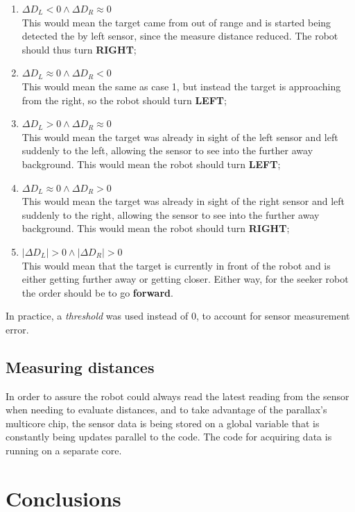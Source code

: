 \documentclass[sigconf,nonacm]{acmart}
\begin{document}
\begin{enumerate}
     \item $\Delta D_L<0 \wedge \Delta D_R \approx 0$ \\ This would mean the
     target came from out of range and is started being detected the by left
     sensor, since the measure distance reduced. The robot should thus
     turn \textbf{RIGHT};
     
     \item $\Delta D_L\approx 0\wedge \Delta D_R < 0$ \\ This would mean the same
     as case 1, but instead the target is approaching from the right, so the
     robot should turn \textbf{LEFT};

     \item $\Delta D_L>0\wedge \Delta D_R \approx 0$ \\ This would mean the
     target was already in sight of the left sensor and left suddenly to the
     left, allowing the sensor to see into the further away background. This
     would mean the robot should turn \textbf{LEFT};
     
     \item $\Delta D_L\approx 0 \wedge \Delta D_R > 0$ \\ This would mean the
     target was already in sight of the right sensor and left suddenly to the
     right, allowing the sensor to see into the further away background. This
     would mean the robot should turn \textbf{RIGHT};

     \item $|\Delta D_L|>0\wedge |\Delta D_R| > 0$ \\ This would mean that the
     target is currently in front of the robot and is either getting further
     away or getting closer. Either way, for the seeker robot the order should
     be to go \textbf{forward}.
\end{enumerate}

In practice, a \textit{threshold} was used instead of 0, to account for sensor
measurement error.


\subsection{Measuring distances}

In order to assure the robot could always read the latest reading from the
sensor when needing to evaluate distances, and to take advantage of the
parallax's multicore chip, the sensor data is being stored on a global variable
that is constantly being updates parallel to the code. The code for acquiring
data is running on a separate core.
 
\section{Conclusions}




\end{document}
